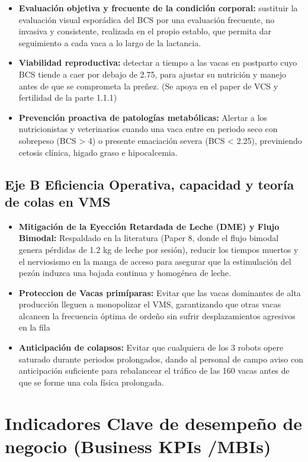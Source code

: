 \documentclass[11pt,letterpaper,DIV=12]{scrartcl}
\begin{document}
\begin{itemize}
  \item \textbf{Evaluación objetiva y frecuente de la condición corporal:} sustituir la evaluación visual esporádica del BCS por una evaluación frecuente, no invasiva y consistente, realizada en el propio establo, que permita dar seguimiento a cada vaca a lo largo de la lactancia.
  \item \textbf{Viabilidad reproductiva:} detectar a tiempo a las vacas en postparto cuyo BCS tiende a caer por debajo de 2.75, para ajustar su nutrición y manejo antes de que se comprometa la preñez. (Se apoya en el paper de VCS y fertilidad de la parte 1.1.1)
  \item \textbf{Prevención proactiva de patologías metabólicas:} Alertar a los nutricionistas y veterinarios cuando una vaca entre en periodo seco con sobrepeso (BCS > 4) o presente emaciación severa (BCS < 2.25), previniendo cetosis clínica, higado graso e hipocalcemia.
\end{itemize}

\subsection{Eje B Eficiencia Operativa, capacidad y teoría de colas en VMS}

\begin{itemize}
  \item \textbf{Mitigación de la Eyección Retardada de Leche (DME) y Flujo Bimodal:} Respaldado en la literatura (Paper 8, donde el flujo bimodal genera pérdidas de 1.2 kg de leche por sesión), reducir los tiempos muertos y el nerviosismo en la manga de acceso para asegurar que la estimulación del pezón induzca una bajada continua y homogénea de leche.
  \item \textbf{Proteccion de Vacas primíparas:} Evitar que las vacas dominantes de alta producción lleguen a monopolizar el VMS, garantizando que otras vacas alcancen la frecuencia óptima de ordeño sin sufrir desplazamientos agresivos en la fila
  \item \textbf{Anticipación de colapsos:} Evitar que cualquiera de los 3 robots opere saturado durante periodos prolongados, dando al personal de campo aviso con anticipación suficiente para rebalancear el tráfico de las 160 vacas antes de que se forme una cola física prolongada.
\end{itemize}

\section{Indicadores Clave de desempeño de negocio (Business KPIs /MBIs)}
\end{document}

